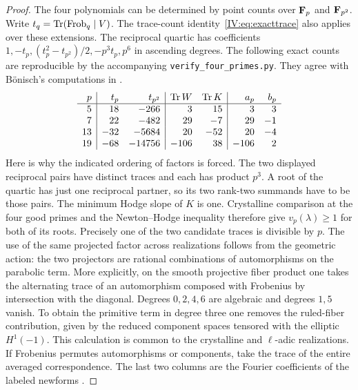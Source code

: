\documentclass[11pt,letterpaper]{article}
\theoremstyle{definition}
\theoremstyle{remark}
\begin{document}
\begin{proof}
The four polynomials can be determined by point counts over $\mathbf F_p$
and $\mathbf F_{p^2}$. Write $t_q=\operatorname{Tr}(\operatorname{Frob}_q\mid V)$. The trace-count
identity~\eqref{IV:eq:exacttrace} also applies over these extensions.
The reciprocal quartic has coefficients $1,-t_p,(t_p^2-t_{p^2})/2,
-p^3t_p,p^6$ in ascending degrees. The following exact counts are
reproducible by the accompanying \texttt{verify\_four\_primes.py}.
They agree with B\"onisch's computations in \cite[\S5.1]{IV:bonisch}.
\[
\begin{array}{r|rr|rr|rr}
p&t_p&t_{p^2}&\operatorname{Tr} W&\operatorname{Tr} K&a_p& b_p\\ \hline
5& 18&-266&3&15&3&3\\
7& 22&-482&29&-7&29&-1\\
13&-32&-5684&20&-52&20&-4\\
19&-68&-14756&-106&38&-106&2
\end{array}
\]
Here is why the indicated ordering of factors is forced.
The two displayed reciprocal pairs have distinct traces and each
has product $p^3$. A root of the quartic has just one reciprocal
partner, so its two rank-two summands have to be those pairs.
The minimum Hodge slope of $K$ is one. Crystalline comparison at
the four good primes and the Newton--Hodge inequality therefore give
$v_p(\lambda)\geq1$
for both of its roots. Precisely one of the two candidate traces is
divisible by $p$. The use of the same projected factor across
realizations follows from the geometric action: the two projectors
are rational combinations of automorphisms on the parabolic term.
More explicitly, on the smooth projective fiber product one takes
the alternating trace of an automorphism composed with Frobenius by
intersection with the diagonal. Degrees $0,2,4,6$ are algebraic and
degrees $1,5$ vanish. To obtain the primitive term in degree three
one removes the ruled-fiber contribution, given by the reduced
component spaces tensored with the elliptic $H^1(-1)$. This
calculation is common to the crystalline and $\ell$-adic realizations.
If Frobenius permutes automorphisms or components, take the trace
of the entire averaged correspondence. The last two columns are the
Fourier coefficients of the labeled newforms \cite[\S5.1]{IV:bonisch}.


\end{proof}
\end{document}
